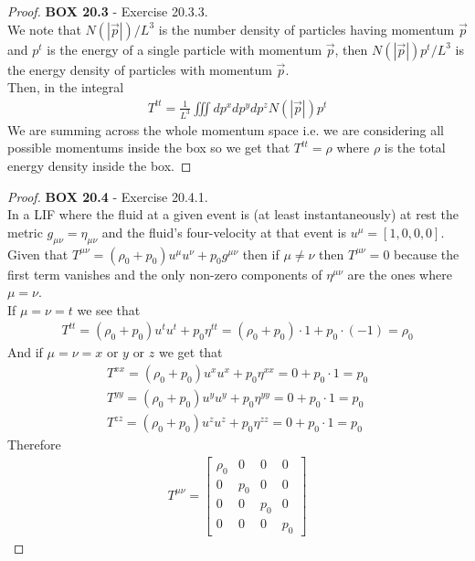 \documentclass[11pt]{article}
\theoremstyle{definition}
\begin{document}
\begin{proof}{\textbf{BOX 20.3} - Exercise 20.3.3.}\\
We note that $N(|\vec{p}|)/L^3$ is the number density of particles having
momentum $\vec{p}$ and $p^t$ is the energy of a single particle with momentum
$\vec{p}$, then $N(|\vec{p}|)p^t/L^3$ is the energy density of particles with
momentum $\vec{p}$.
\\
Then, in the integral
\begin{align*}
    T^{tt} = \frac{1}{L^3}\iiint dp^xdp^ydp^z N(|\vec{p}|)p^t
\end{align*}
We are summing across the whole momentum space i.e. we are considering all
possible momentums inside the box so we get that $T^{tt} = \rho$ where $\rho$
is the total energy density inside the box.
\end{proof}

\cleardoublepage
\begin{proof}{\textbf{BOX 20.4} - Exercise 20.4.1.}\\
In a LIF where the fluid at a given event is (at least instantaneously) at rest
the metric $g_{\mu\nu} = \eta_{\mu\nu}$ and the fluid's four-velocity at that
event is $u^\mu = [1,0,0,0]$.\\
Given that $T^{\mu\nu} = (\rho_0 + p_0)u^\mu u^\nu + p_0g^{\mu\nu}$ then if
$\mu \neq \nu$ then $T^{\mu\nu} = 0$ because the first term vanishes and the
only non-zero components of $\eta^{\mu\nu}$ are the ones where $\mu = \nu$.\\
If $\mu = \nu = t$ we see that
\begin{align*}
    T^{tt} = (\rho_0 + p_0)u^t u^t + p_0\eta^{tt}
    = (\rho_0 + p_0)\cdot 1 + p_0\cdot (-1)
    = \rho_0
\end{align*}
And if $\mu = \nu = x \text{ or } y \text{ or } z$ we get that 
\begin{align*}
    T^{xx} = (\rho_0 + p_0)u^x u^x + p_0\eta^{xx} = 0 + p_0 \cdot 1
    = p_0\\
    T^{yy} = (\rho_0 + p_0)u^y u^y + p_0\eta^{yy} = 0 + p_0 \cdot 1
    = p_0\\
    T^{zz} = (\rho_0 + p_0)u^z u^z + p_0\eta^{zz} = 0 + p_0 \cdot 1
    = p_0
\end{align*}
Therefore 
\begin{align*}
    T^{\mu\nu} = \begin{bmatrix}
        \rho_0 & 0 & 0 & 0\\
        0 & p_0 & 0 & 0\\
        0 & 0 & p_0 & 0\\
        0 & 0 & 0 & p_0
    \end{bmatrix}
\end{align*}
\end{proof}
\end{document}
